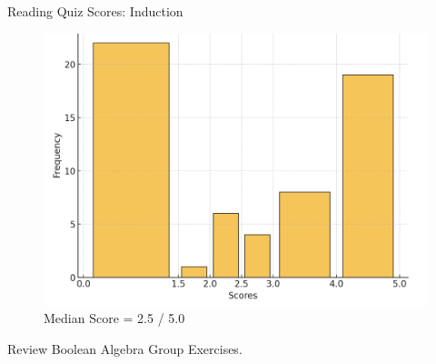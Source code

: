 \documentclass[10pt]{beamer}
\begin{document}
\begin{frame}{Reading Quiz Scores: Induction}

\begin{figure}[ht]
        \centering
        \includegraphics[width=.8\textwidth]{images/ch4_reading_quiz_scores}
   		\caption{Median Score = 2.5 / 5.0}
\end{figure}
\vfill 

\end{frame}

\begin{frame}[standout]
Review Boolean Algebra Group Exercises.
	
\end{frame}
\end{document}
